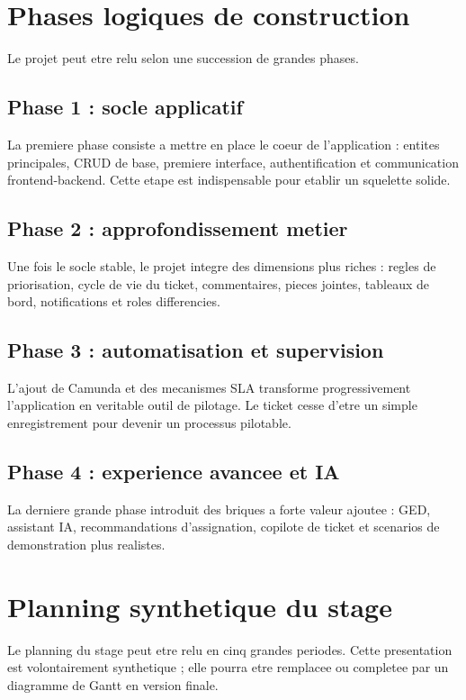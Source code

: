 \section{Phases logiques de construction}

Le projet peut etre relu selon une succession de grandes phases.

\subsection{Phase 1 : socle applicatif}

La premiere phase consiste a mettre en place le coeur de l'application : entites principales, CRUD de base, premiere interface, authentification et communication frontend-backend. Cette etape est indispensable pour etablir un squelette solide.

\subsection{Phase 2 : approfondissement metier}

Une fois le socle stable, le projet integre des dimensions plus riches : regles de priorisation, cycle de vie du ticket, commentaires, pieces jointes, tableaux de bord, notifications et roles differencies.

\subsection{Phase 3 : automatisation et supervision}

L'ajout de Camunda et des mecanismes SLA transforme progressivement l'application en veritable outil de pilotage. Le ticket cesse d'etre un simple enregistrement pour devenir un processus pilotable.

\subsection{Phase 4 : experience avancee et IA}

La derniere grande phase introduit des briques a forte valeur ajoutee : GED, assistant IA, recommandations d'assignation, copilote de ticket et scenarios de demonstration plus realistes.

\section{Planning synthetique du stage}

Le planning du stage peut etre relu en cinq grandes periodes. Cette presentation est volontairement synthetique ; elle pourra etre remplacee ou completee par un diagramme de Gantt en version finale.

